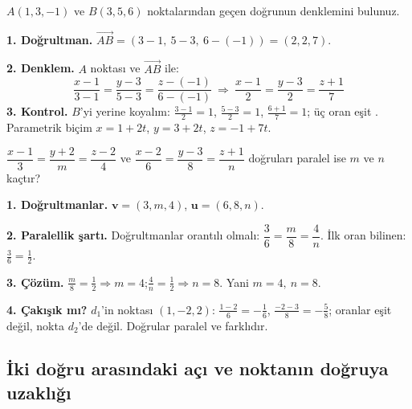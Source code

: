 \begin{soru}
$A(1,3,-1)$ ve $B(3,5,6)$ noktalarından geçen doğrunun denklemini bulunuz.
\end{soru}
\begin{cevap}
\textbf{1. Doğrultman.} $\overrightarrow{AB}=(3-1,\ 5-3,\ 6-(-1))=(2,2,7)$.

\textbf{2. Denklem.} $A$ noktası ve $\overrightarrow{AB}$ ile:
\[ \frac{x-1}{3-1}=\frac{y-3}{5-3}=\frac{z-(-1)}{6-(-1)}\ \Longrightarrow\ \boxed{\frac{x-1}{2}=\frac{y-3}{2}=\frac{z+1}{7}} \]
\textbf{3. Kontrol.} $B$'yi yerine koyalım: $\frac{3-1}{2}=1$, $\frac{5-3}{2}=1$, $\frac{6+1}{7}=1$; üç oran eşit \checkmark. Parametrik biçim $x=1+2t$, $y=3+2t$, $z=-1+7t$.
\end{cevap}

\begin{soru}
$\dfrac{x-1}{3}=\dfrac{y+2}{m}=\dfrac{z-2}{4}$ ve $\dfrac{x-2}{6}=\dfrac{y-3}{8}=\dfrac{z+1}{n}$ doğruları paralel ise $m$ ve $n$ kaçtır?
\end{soru}
\begin{cevap}
\textbf{1. Doğrultmanlar.} $\mathbf v=(3,m,4)$, $\mathbf u=(6,8,n)$.

\textbf{2. Paralellik şartı.} Doğrultmanlar orantılı olmalı: $\dfrac36=\dfrac m8=\dfrac4n$. İlk oran bilinen: $\frac36=\frac12$.

\textbf{3. Çözüm.} $\frac m8=\frac12\Rightarrow m=4$;\quad $\frac4n=\frac12\Rightarrow n=8$. Yani $\boxed{m=4,\ n=8}$.

\textbf{4. Çakışık mı?} $d_1$'in noktası $(1,-2,2)$: $\frac{1-2}{6}=-\frac16$, $\frac{-2-3}{8}=-\frac58$; oranlar eşit değil, nokta $d_2$'de değil. Doğrular paralel ve farklıdır.
\end{cevap}

\subsection{İki doğru arasındaki açı ve noktanın doğruya uzaklığı}

